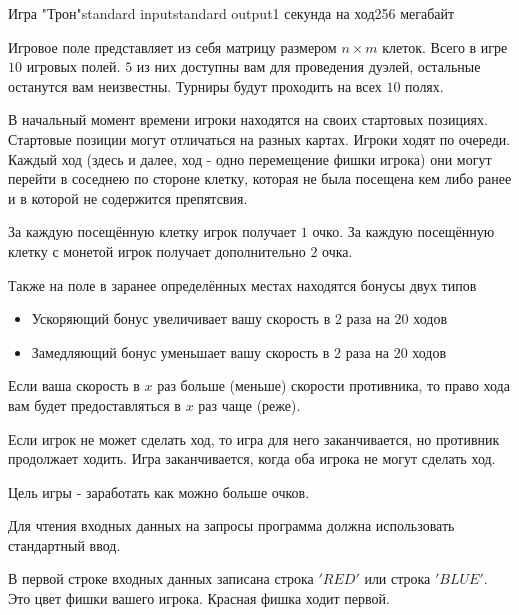 \begin{problem}{Игра "Трон"}{standard input}{standard output}{1 секунда на ход}{256 мегабайт}

\par Игровое поле представляет из себя матрицу размером $n \times m$ клеток. Всего в игре $10$ игровых полей. $5$ из них доступны вам для проведения дуэлей, остальные останутся вам неизвестны. Турниры будут проходить на всех $10$ полях.

\par В начальный момент времени игроки находятся на своих стартовых позициях. Стартовые позиции могут отличаться на разных картах.
Игроки ходят по очереди. Каждый ход (здесь и далее, ход - одно перемещение фишки игрока) они могут перейти в соседнею по стороне клетку, которая не была посещена кем либо ранее и в которой не содержится препятсвия.

\par За каждую посещённую клетку игрок получает $1$ очко. За каждую посещённую клетку с монетой
игрок получает дополнительно $2$ очка.


\par Также на поле в заранее определённых местах находятся бонусы двух типов
\begin{itemize}
    \item Ускоряющий бонус увеличивает вашу скорость в $2$ раза на $20$ ходов
    \item Замедляющий бонус уменьшает вашу скорость в $2$ раза на $20$ ходов
\end{itemize}

\par Если ваша скорость в $x$ раз больше (меньше) скорости противника, то право хода вам будет предоставляться в $x$ раз чаще (реже).

\par Если игрок не может сделать ход, то игра для него заканчивается, но противник продолжает ходить. Игра заканчивается, когда оба игрока не могут сделать ход.
\par Цель игры - заработать как можно больше очков.

\InputFile

\par Для чтения входных данных на запросы программа должна использовать стандартный ввод.

    
\par В первой строке входных данных записана строка $'RED'$ или строка $'BLUE'$. Это цвет фишки вашего игрока. Красная фишка ходит первой.


\end{problem}
